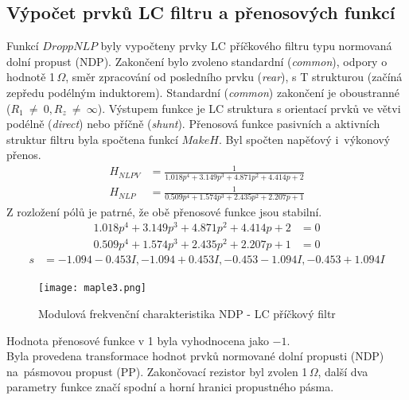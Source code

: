\subsection{Výpočet prvků LC filtru a přenosových funkcí}\label{s:VYP}
\noindent Funkcí $DroppNLP$ byly vypočteny prvky LC příčkového filtru typu normovaná dolní propust (NDP). Zakončení bylo zvoleno standardní (\textit{common}), odpory o hodnotě 1\,$\Omega$, směr zpracování od posledního prvku (\textit{rear}), s T strukturou (začíná zepředu podélným induktorem). Standardní (\textit{common}) zakončení je oboustranné ($R_1~\neq~0, R_z~\neq~\infty$). Výstupem funkce je LC struktura s orientací prvků ve větvi podélně (\textit{direct}) nebo příčně (\textit{shunt}).
\MapleOutput{block (3), [orientation = direct, elements = {L1 = 1.561}, Z = p L1}
\noindent Přenosová funkce pasivních a aktivních struktur filtru byla spočtena funkcí $MakeH$. Byl spočten  napěťový i~výkonový přenos.
\begin{align}
H_{NLPV} &= \frac{1}{1.018p^4  + 3.149p^3  + 4.871p^2  + 4.414p + 2}\\
H_{NLP} &= \frac{1}{0.509p^4 + 1.574p^3 + 2.435p^2 + 2.207p + 1}
\end{align}
\noindent Z rozložení pólů je patrné, že obě přenosové funkce jsou stabilní.
\begin{align}
1.018p^4  + 3.149p^3  + 4.871p^2  + 4.414p + 2 &= 0 \\
0.509p^4 + 1.574p^3 + 2.435p^2 + 2.207p + 1 &= 0
\end{align}
\begin{align}
s &= {-1.094 - 0.453 I}, {-1.094 + 0.453 I}, {-0.453 - 1.094 I}, {-0.453 + 1.094 I}
\end{align}
\begin{figure}[h]
\centering
\texttt{[image: maple3.png]}
\caption{Modulová frekvenční charakteristika NDP - LC příčkový filtr}
\end{figure}
\noindent Hodnota přenosové funkce v 1 byla vyhodnocena jako $-1$.\\
\noindent Byla provedena transformace hodnot prvků normované dolní propusti (NDP) na~pásmovou propust (PP). Zakončovací rezistor byl zvolen 1\,$\Omega$, další dva parametry funkce značí spodní a horní hranici propustného pásma.\\

